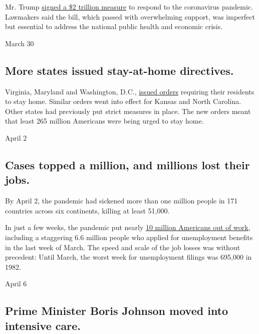 Mr. Trump
\href{https://www.nytimes3xbfgragh.onion/2020/03/27/us/politics/coronavirus-house-voting.html}{signed
a \$2 trillion measure} to respond to the coronavirus pandemic.
Lawmakers said the bill, which passed with overwhelming support, was
imperfect but essential to address the national public health and
economic crisis.

March 30

\hypertarget{more-states-issued-stay-at-home-directives}{%
\subsection{More states issued stay-at-home
directives.}\label{more-states-issued-stay-at-home-directives}}

Virginia, Maryland and Washington, D.C.,
\href{https://www.nytimes3xbfgragh.onion/interactive/2020/us/coronavirus-stay-at-home-order.html}{issued
orders} requiring their residents to stay home. Similar orders went into
effect for Kansas and North Carolina. Other states had previously put
strict measures in place. The new orders meant that least 265 million
Americans were being urged to stay home.

April 2

\hypertarget{cases-topped-a-million-and-millions-lost-their-jobs}{%
\subsection{Cases topped a million, and millions lost their
jobs.}\label{cases-topped-a-million-and-millions-lost-their-jobs}}

By April 2, the pandemic had sickened more than one million people in
171 countries across six continents, killing at least 51,000.

In just a few weeks, the pandemic put nearly
\href{https://www.nytimes3xbfgragh.onion/2020/04/02/business/economy/coronavirus-unemployment-claims.html}{10
million Americans out of work}, including a staggering 6.6 million
people who applied for unemployment benefits in the last week of March.
The speed and scale of the job losses was without precedent: Until
March, the worst week for unemployment filings was 695,000 in 1982.

April 6

\hypertarget{prime-minister-boris-johnson-moved-into-intensive-care}{%
\subsection{Prime Minister Boris Johnson moved into intensive
care.}\label{prime-minister-boris-johnson-moved-into-intensive-care}}

